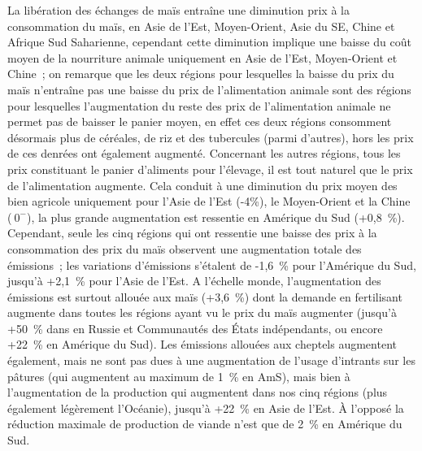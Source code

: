 La libération des échanges de maïs entraîne une diminution prix à la consommation du maïs, en Asie de l'Est, Moyen-Orient, Asie du SE, Chine et Afrique Sud Saharienne, cependant cette diminution implique une baisse du coût moyen de la nourriture animale uniquement en Asie de l'Est, Moyen-Orient et Chine~; on remarque que les deux régions pour lesquelles la baisse du prix du maïs n'entraîne pas une baisse du prix de l'alimentation animale sont des régions pour lesquelles l'augmentation du reste des prix de l'alimentation animale ne permet pas de baisser le panier moyen, en effet ces deux régions consomment désormais plus de céréales, de riz et des tubercules (parmi d'autres), hors les prix de ces denrées ont également augmenté. Concernant les autres régions, tous les prix constituant le panier d'aliments pour l'élevage, il est tout naturel que le prix de l'alimentation augmente. Cela conduit à une diminution du prix moyen des bien agricole uniquement pour l'Asie de l'Est (-4\%), le Moyen-Orient et la Chine ($~0^-$), la plus grande augmentation est ressentie en Amérique du Sud (+0,8~\%). Cependant, seule les cinq régions qui ont ressentie une baisse des prix à la consommation des prix du maïs observent une augmentation totale des émissions~; les variations d'émissions s’étalent de -1,6~\% pour l'Amérique du Sud, jusqu'à +2,1~\% pour l'Asie de l'Est. A l'échelle monde, l'augmentation des émissions est surtout allouée aux maïs (+3,6~\%) dont la demande en fertilisant augmente dans toutes les régions ayant vu le prix du maïs augmenter (jusqu'à +50~\% dans en Russie et Communautés des États indépendants, ou encore +22~\% en Amérique du Sud). Les émissions allouées aux cheptels augmentent également, mais ne sont pas dues à une augmentation de l'usage d'intrants sur les pâtures (qui augmentent au maximum de 1~\% en AmS), mais bien à l'augmentation de la production qui augmentent dans nos cinq régions (plus également légèrement l'Océanie), jusqu'à +22~\% en Asie de l'Est. À l'opposé la réduction maximale de production de viande n'est que de 2~\% en Amérique du Sud.

